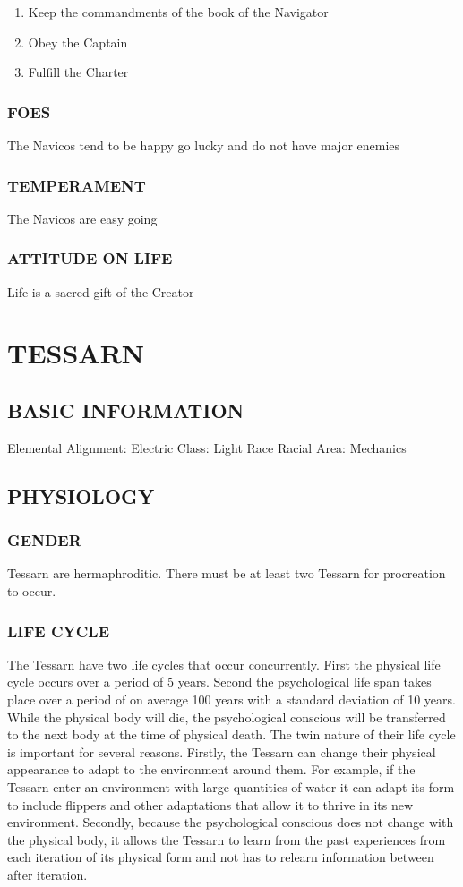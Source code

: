 \begin{enumerate}
\item Keep the commandments of the book of the Navigator
\item Obey the Captain
\item Fulfill the Charter
\end{enumerate}

\subsubsection{FOES}
The Navicos tend to be happy go lucky and do not have major enemies
\subsubsection{TEMPERAMENT}
The Navicos are easy going
\subsubsection{ATTITUDE ON LIFE}
Life is a sacred gift of the Creator


\section{TESSARN}
\subsection{BASIC INFORMATION}
Elemental Alignment: Electric
Class: Light Race
Racial Area: Mechanics
\subsection{PHYSIOLOGY}
\subsubsection{GENDER}
Tessarn are hermaphroditic.  There must be at least two Tessarn for procreation
to occur.  
\subsubsection{LIFE CYCLE}
The Tessarn have two life cycles that occur concurrently.  First the physical
life cycle occurs over a period of 5 years.  Second the psychological life span
takes place over a period of on average 100 years with a standard deviation of
10 years.  While the physical body will die, the psychological conscious will
be transferred to the next body at the time of physical death.  The twin nature
of their life cycle is important for several reasons.  Firstly, the Tessarn can
change their physical appearance to adapt to the environment around them.  For
example, if the Tessarn enter an environment with large quantities of water it
can adapt its form to include flippers and other adaptations that allow it to
thrive in its new environment.  Secondly, because the psychological conscious
does not change with the physical body, it allows the Tessarn to learn from the
past experiences from each iteration of its physical form and not has to
relearn information between after iteration.    
